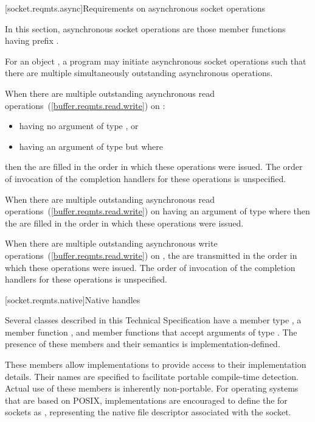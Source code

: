 [socket.reqmts.async]{Requirements on asynchronous socket operations}

\pnum
In this section, asynchronous socket operations are those member functions having prefix .

\pnum
For an object , a program may initiate asynchronous socket operations such that there are multiple simultaneously outstanding asynchronous operations.

\pnum
When there are multiple outstanding asynchronous read operations~(\ref{buffer.reqmts.read.write}) on :

\begin{itemize}
\item
having no argument  of type , or
\item
having an argument  of type  but where 
\end{itemize}

then the  are filled in the order in which these operations were issued. The order of invocation of the completion handlers for these operations is unspecified.

\pnum
When there are multiple outstanding asynchronous read operations~(\ref{buffer.reqmts.read.write}) on  having an argument  of type  where  then the  are filled in the order in which these operations were issued.

\pnum
When there are multiple outstanding asynchronous write operations~(\ref{buffer.reqmts.read.write}) on , the  are transmitted in the order in which these operations were issued. The order of invocation of the completion handlers for these operations is unspecified.



[socket.reqmts.native]{Native handles}

\pnum
Several classes described in this Technical Specification have a member type , a member function , and member functions that accept arguments of type . The presence of these members and their semantics is implementation-defined.

\pnum
\enternote These members allow implementations to provide access to their implementation details. Their names are specified to facilitate portable compile-time detection. Actual use of these members is inherently non-portable. For operating systems that are based on POSIX, implementations are encouraged to define the  for sockets as , representing the native file descriptor associated with the socket. \exitnote



